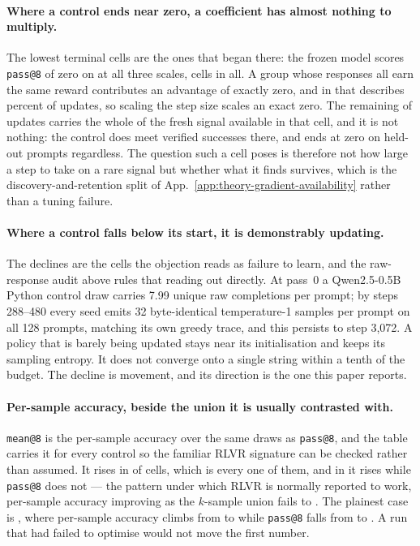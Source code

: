 \documentclass{article}
\newcommand{\1}{\mathbf 1}
\theoremstyle{remark}
\theoremstyle{definition}
\theoremstyle{plain}
\begin{document}
\paragraph{Where a control ends near zero, a coefficient has almost nothing to
multiply.}
The lowest terminal cells are the ones that began there: the frozen model
scores \texttt{pass@8} of zero on \MDctlZeroBaseDomain{} at all three scales,
\MDctlZeroBaseCells{} cells in all. A group whose responses all earn the same
reward contributes an advantage of exactly zero, and in \MDctlLeanestCell{}
that describes \MDctlLeanestZero{} percent of updates, so scaling the step size
scales an exact zero. The remaining \MDctlLeanestMixed{} of updates carries the
whole of the fresh signal available in that cell, and it is not nothing: the
control does meet verified successes there, and ends at zero on held-out
prompts regardless. The question such a cell poses is therefore not how large a
step to take on a rare signal but whether what it finds survives, which is the
discovery-and-retention split of App.~\ref{app:theory-gradient-availability}
rather than a tuning failure.

\paragraph{Where a control falls below its start, it is demonstrably updating.}
The declines are the cells the objection reads as failure to learn, and the
raw-response audit above rules that reading out directly. At pass~0 a
Qwen2.5-0.5B Python control draw carries 7.99 unique raw completions per
prompt; by steps 288--480 every seed emits 32 byte-identical temperature-1
samples per prompt on all 128 prompts, matching its own greedy trace, and this
persists to step 3,072. A policy that is barely being updated stays near its
initialisation and keeps its sampling entropy. It does not converge onto a
single string within a tenth of the budget. The decline is movement, and its
direction is the one this paper reports.

\paragraph{Per-sample accuracy, beside the union it is usually contrasted
with.}
\texttt{mean@8} is the per-sample accuracy over the same draws as
\texttt{pass@8}, and the table carries it for every control so the familiar
RLVR signature can be checked rather than assumed. It rises in
\MDctlMeanUp{} of \MDctlPaired{} cells, which is every one of them, and in
\MDctlYue{} it rises while \texttt{pass@8} does not --- the pattern under which
RLVR is normally reported to work, per-sample accuracy improving as the
$k$-sample union fails to \citep{yue2025rlvrlimit}. The plainest case is
\MDctlPatternCell{}, where per-sample accuracy climbs from
\MDctlPatternMeanFrom{} to \MDctlPatternMeanTo{} while \texttt{pass@8} falls
from \MDctlPatternPassFrom{} to \MDctlPatternPassTo{}. A run that had failed to
optimise would not move the first number.
\end{document}

